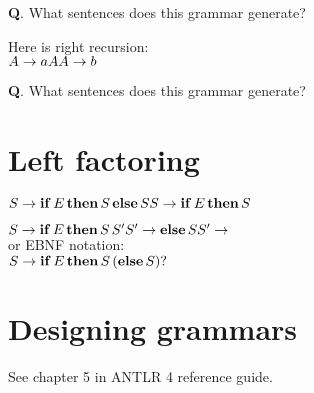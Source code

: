 \documentclass[11pt,twocolumn,nocopyright]{sigplanconf}
\begin{document}
{\bf Q}. What sentences does this grammar generate?

\noindent Here is right recursion:\\

\noindent $
A \rightarrow a A\\
A \rightarrow b\\
$

{\bf Q}. What sentences does this grammar generate?

\section{Left factoring}

\noindent $
S \rightarrow {\bf if}\, E\, {\bf then}\, S\, {\bf else}\, S\\
S \rightarrow {\bf if}\, E\, {\bf then}\, S\\
$

\noindent $
S \rightarrow {\bf if}\, E\, {\bf then}\, S\, S'\\
S' \rightarrow {\bf else}\, S \\
S' \rightarrow
$\\

\noindent or EBNF notation:\\

\noindent $
S \rightarrow {\bf if}\, E\, {\bf then}\, S\, ({\bf else}\, S)?\\
$

\section{Designing grammars}

See chapter 5 in ANTLR 4 reference guide.
\end{document}
